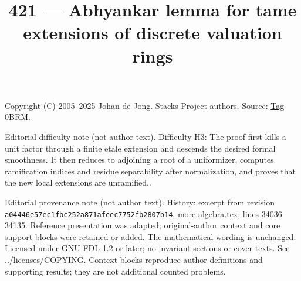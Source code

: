 \documentclass{amsart}
\theoremstyle{plain}
\theoremstyle{definition}
\theoremstyle{remark}
\numberwithin{equation}{subsection}
\begin{document}
\title[Stacks Project, Tag 0BRM]{421 --- Abhyankar lemma for tame extensions of discrete valuation rings}
\maketitle
\noindent Copyright (C) 2005--2025 Johan de Jong. Stacks Project authors. Source: \href{https://stacks.math.columbia.edu/tag/0BRM}{Tag 0BRM}.

\noindent Editorial difficulty note (not author text). Difficulty H3: The proof first kills a unit factor through a finite etale extension and descends the desired formal smoothness. It then reduces to adjoining a root of a uniformizer, computes ramification indices and residue separability after normalization, and proves that the new local extensions are unramified..

\noindent Editorial provenance note (not author text). History: excerpt from revision \texttt{a0444\allowbreak 6e57e\allowbreak c1fbc\allowbreak 252a8\allowbreak 71afc\allowbreak ec775\allowbreak 2fb28\allowbreak 07b14}, more-algebra.tex, lines 34036--34135. Reference presentation was adapted; original-author context and core support blocks were retained or added. The mathematical wording is unchanged. Licensed under GNU FDL 1.2 or later; no invariant sections or cover texts. See ../licenses/COPYING. Context blocks reproduce author definitions and supporting results; they are not additional counted problems.
\end{document}
